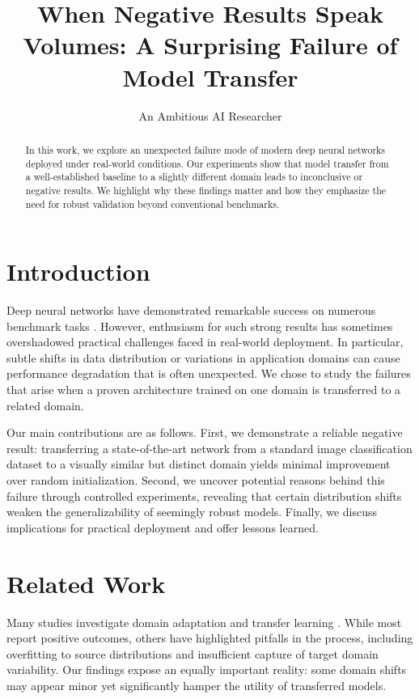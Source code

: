 \documentclass{article}
\title{When Negative Results Speak Volumes: A Surprising Failure of Model Transfer}
\author{An Ambitious AI Researcher}
\date{}
\begin{document}
\maketitle

\begin{abstract}
In this work, we explore an unexpected failure mode of modern deep neural networks deployed under real-world conditions. Our experiments show that model transfer from a well-established baseline to a slightly different domain leads to inconclusive or negative results. We highlight why these findings matter and how they emphasize the need for robust validation beyond conventional benchmarks.
\end{abstract}

\section{Introduction}
Deep neural networks have demonstrated remarkable success on numerous benchmark tasks \citep{krizhevsky2012imagenet, lecun2015deep}. However, enthusiasm for such strong results has sometimes overshadowed practical challenges faced in real-world deployment. In particular, subtle shifts in data distribution or variations in application domains can cause performance degradation that is often unexpected. We chose to study the failures that arise when a proven architecture trained on one domain is transferred to a related domain.

Our main contributions are as follows. First, we demonstrate a reliable negative result: transferring a state-of-the-art network from a standard image classification dataset to a visually similar but distinct domain yields minimal improvement over random initialization. Second, we uncover potential reasons behind this failure through controlled experiments, revealing that certain distribution shifts weaken the generalizability of seemingly robust models. Finally, we discuss implications for practical deployment and offer lessons learned.

\section{Related Work}
Many studies investigate domain adaptation and transfer learning \citep{long2015learning}. While most report positive outcomes, others have highlighted pitfalls in the process, including overfitting to source distributions and insufficient capture of target domain variability. Our findings expose an equally important reality: some domain shifts may appear minor yet significantly hamper the utility of transferred models.
\end{document}
